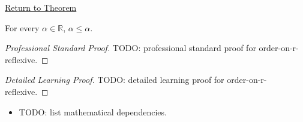 \newpage
{}
\label{prf:order-on-r-reflexive}

\begin{remark*}[Return]
\hyperref[thm:order-on-r-reflexive]{Return to Theorem}
\end{remark*}

\begin{theorem*}
For every $\alpha\in\mathbb{R}$, $\alpha\le\alpha$.
\end{theorem*}

\begin{proof}[Professional Standard Proof]
\LRAProofBodyStart
TODO: professional standard proof for order-on-r-reflexive.
\end{proof}

\begin{proof}[Detailed Learning Proof]
\LRAProofBodyStart
TODO: detailed learning proof for order-on-r-reflexive.
\end{proof}

\begin{remark*}
\end{remark*}

\begin{dependencies}
\begin{itemize}
  \item TODO: list mathematical dependencies.
\end{itemize}
\end{dependencies}

\clearpage
